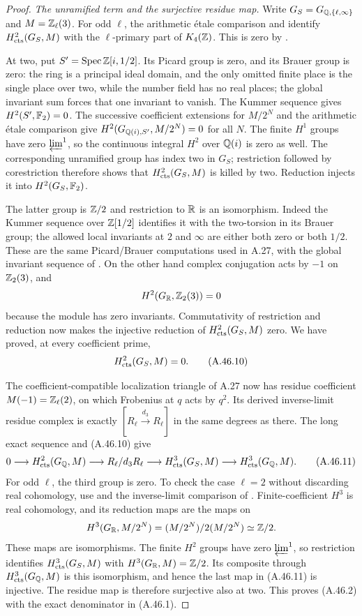 \begin{proof}
\emph{The unramified term and the surjective residue map.}
Write $G_S=G_{\mathbb Q,\{\ell,\infty\}}$ and $M=\mathbb Z_\ell(3)$.
For odd $\ell$, the arithmetic \'etale comparison and
\cite[VI, Theorem 8.2]{Weibel2013} identify
$H^2_{\rm cts}(G_S,M)$ with the $\ell$-primary part of
$K_4(\mathbb Z)$.  This is zero by
\cite[Theorem 0.1]{BIR_Rognes2000}.

At two, put $S'=\operatorname{Spec}\mathbb Z[i,1/2]$.
Its Picard group is zero, and its Brauer group is zero:
the ring is a principal ideal domain, and the only omitted
finite place is the single place over two, while the number
field has no real places; the global invariant sum forces
that one invariant to vanish.  The Kummer sequence gives
$H^2(S',\mathbb F_2)=0$.  The successive coefficient extensions for
$M/2^N$ and the arithmetic \'etale comparison give
$H^2(G_{\mathbb Q(i),S'},M/2^N)=0$ for all $N$.
The finite $H^1$ groups have zero $\varprojlim^1$, so the
continuous integral $H^2$ over $\mathbb Q(i)$ is zero as well.
The corresponding unramified group has index two in $G_S$;
restriction followed by corestriction therefore shows that
$H^2_{\rm cts}(G_S,M)$ is killed by two.  Reduction injects
it into $H^2(G_S,\mathbb F_2)$.

The latter group is $\mathbb Z/2$ and restriction to $\mathbb R$ is an
isomorphism.  Indeed the Kummer sequence over $\mathbb Z[1/2]$
identifies it with the two-torsion in its Brauer group;
the allowed local invariants at $2$ and $\infty$ are either
both zero or both $1/2$.  These are the same Picard/Brauer
computations used in A.27, with the global invariant sequence
of \cite[II, Proposition 2.1]{BIR_MilneADT}.
On the other hand complex conjugation acts by $-1$ on
$\mathbb Z_2(3)$, and
\[
                    H^2(G_\mathbb R,\mathbb Z_2(3))=0
\]
because the module has zero invariants.  Commutativity of
restriction and reduction now makes the injective reduction
of $H^2_{\rm cts}(G_S,M)$ zero.  We have proved, at every
coefficient prime,
\[
                         H^2_{\rm cts}(G_S,M)=0.
 \tag{A.46.10}
\]

The coefficient-compatible localization triangle of A.27
now has residue coefficient $M(-1)=\mathbb Z_\ell(2)$, on which
Frobenius at $q$ acts by $q^2$.  Its derived inverse-limit
residue complex is exactly
$[R_\ell\xrightarrow{d_3}R_\ell]$ in the same degrees as
there.  The long exact sequence and (A.46.10) give
\[
 0\longrightarrow H^2_{\rm cts}(G_\mathbb Q,M)
 \longrightarrow R_\ell/d_3R_\ell
 \longrightarrow H^3_{\rm cts}(G_S,M)
 \longrightarrow H^3_{\rm cts}(G_\mathbb Q,M).
 \tag{A.46.11}
\]
For odd $\ell$, the third group is zero.  To check the case
$\ell=2$ without discarding real cohomology, use
\cite[I, Theorem 4.10(c) and Corollary 4.15]{BIR_MilneADT}
and the inverse-limit comparison of
\cite[(1.6) and Theorem 2.2]{BIR_Jannsen1988}.
Finite-coefficient $H^3$ is real cohomology, and its
reduction maps are the maps on
\[
 H^3(G_\mathbb R,M/2^N)=(M/2^N)/2(M/2^N)\simeq\mathbb Z/2.
\]
These maps are isomorphisms.  The finite $H^2$ groups have
zero $\varprojlim^1$, so restriction identifies
$H^3_{\rm cts}(G_S,M)$ with
$H^3(G_\mathbb R,M)=\mathbb Z/2$.  Its composite through
$H^3_{\rm cts}(G_\mathbb Q,M)$ is this isomorphism, and hence
the last map in (A.46.11) is injective.  The residue map
is therefore surjective also at two.  This proves (A.46.2)
with the exact denominator in (A.46.1).


\end{proof}
